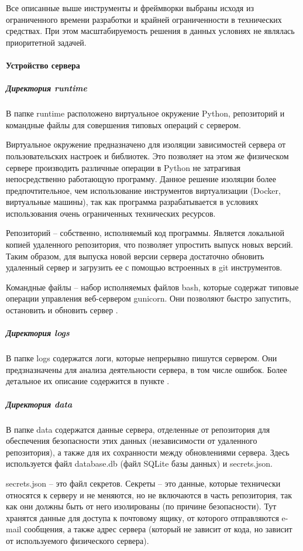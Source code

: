 \documentclass[explnote]{espd}
\begin{document}
Все описанные выше инструменты и фреймворки выбраны исходя из ограниченного времени разработки и крайней ограниченности в технических средствах. При этом масштабируемость решения в данных условиях не являлась приоритетной задачей.

\paragraph{Устройство сервера}
\subparagraph{Директория runtime}
В папке runtime расположено виртуальное окружение Python, репозиторий и командные файлы для совершения типовых операций с сервером.

Виртуальное окружение предназначено для изоляции зависимостей сервера от пользовательских настроек и библиотек. Это позволяет на этом же физическом сервере производить различные операции в Python не затрагивая непосредственно работающую программу. Данное решение изоляции более предпочтительное, чем использование инструментов виртуализации (Docker, виртуальные машины), так как программа разрабатывается в условиях использования очень ограниченных технических ресурсов.

Репозиторий -- собственно, исполняемый код программы. Является локальной копией удаленного репозитория, что позволяет упростить выпуск новых версий. Таким образом, для выпуска новой версии сервера достаточно обновить удаленный сервер и загрузить ее с помощью встроенных в git инструментов.

Командные файлы -- набор исполняемых файлов bash, которые содержат типовые операции управления веб-сервером gunicorn. Они позволяют быстро запустить, остановить и обновить сервер .

\subparagraph{Директория logs}
В папке logs содержатся логи, которые непрерывно пишутся сервером. Они предзназначены для анализа деятельности сервера, в том числе ошибок. Более детальное их описание содержится в пункте \label{paragraph:output}.

\subparagraph{Директория data}
В папке data содержатся данные сервера, отделенные от репозитория для обеспечения безопасности этих данных (независимости от удаленного репозитория), а также для их сохранности между обновлениями сервера. Здесь используется файл database.db (файл SQLite базы данных) и secrets.json.

secrets.json -- это файл секретов. Секреты -- это данные, которые технически относятся к серверу и не меняются, но не включаются в часть репозитория, так как они должны быть от него изолированы (по причине безопасности). Тут хранятся данные для доступа к почтовому ящику, от которого отправляются e-mail сообщения, а также адрес сервера (который не зависит от кода, но зависит от используемого физического сервера).
\end{document}
